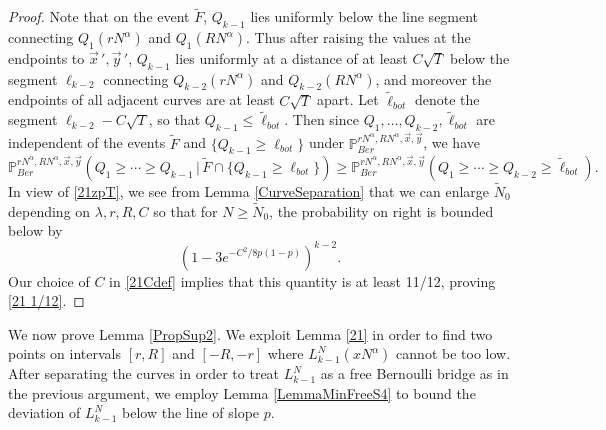 \begin{proof}
		Note that on the event $\tilde F$, $Q_{k-1}$ lies uniformly below the line segment connecting $Q_1(rN^\alpha)$ and $Q_1(RN^\alpha)$. Thus after raising the values at the endpoints to $\vec{x}\,',\vec{y}\,'$, $Q_{k-1}$ lies uniformly at a distance of at least $C\sqrt{T}$ below the segment $\ell_{k-2}$ connecting $Q_{k-2}(rN^\alpha)$ and $Q_{k-2}(RN^\alpha)$, and moreover the endpoints of all adjacent curves are at least $C\sqrt{T}$ apart. Let $\tilde{\ell}_{bot}$ denote the segment $\ell_{k-2} - C\sqrt{T}$, so that $Q_{k-1} \leq \tilde\ell_{bot}$. Then since $Q_1,\dots,Q_{k-2},\tilde \ell_{bot}$ are independent of the events $\tilde F$ and $\{Q_{k-1} \geq \ell_{bot}\}$ under $\mathbb{P}^{rN^\alpha, RN^\alpha,\vec{x},\vec{y}}_{Ber}$, we have 
		\[
		\mathbb{P}^{rN^\alpha, RN^\alpha,\vec{x},\vec{y}}_{Ber} \left(Q_1 \geq \cdots \geq Q_{k-1}\,\big|\,\tilde F\cap \{ Q_{k-1} \geq \ell_{bot}\}\right) \geq \mathbb{P}^{rN^\alpha, RN^\alpha,\vec{x},\vec{y}}_{Ber} \left(Q_1 \geq \cdots \geq Q_{k-2} \geq \tilde \ell_{bot}\right).
		\]
		In view of \eqref{21zpT}, we see from Lemma \ref{CurveSeparation} that we can enlarge $\tilde{N}_0$ depending on $\lambda, r, R, C$ so that for $N\geq\tilde{N}_0$, the probability on right is bounded below by
		\[
		\left(1-3e^{-C^2/8p(1-p)}\right)^{k-2}.
		\]
		Our choice of $C$ in \eqref{21Cdef} implies that this quantity is at least 11/12, proving \eqref{21 1/12}.
		
	\end{proof}

	We now prove Lemma \ref{PropSup2}. We exploit Lemma \ref{21} in order to find two points on intervals $[r,R]$ and $[-R,-r]$ where $L_{k-1}^N(xN^\alpha)$ cannot be too low. After separating the curves in order to treat $L_{k-1}^N$ as a free Bernoulli bridge as in the previous argument, we employ Lemma \ref{LemmaMinFreeS4} to bound the deviation of $L_{k-1}^N$ below the line of slope $p$.
	
